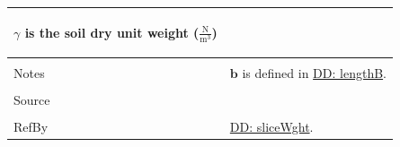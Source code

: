 \documentclass[12pt]{article}
\begin{document}
\begin{minipage}{\textwidth}
\begin{tabular}{p{} p{}}
\begin{symbDescription}
              \item{$γ$ is the soil dry unit weight ($\frac{\text{N}}{\text{m}^{3}}$)}
              \end{symbDescription}
\\ \midrule \\
Notes & $\mathbf{b}$ is defined in \hyperref[DD:lengthB]{DD: lengthB}.
\\ \midrule \\
Source & \cite{fredlund1977}
\\ \midrule \\
RefBy & \hyperref[DD:sliceWght]{DD: sliceWght}.
\\ \bottomrule \end{tabular}
\end{minipage}
\par~
\end{document}
